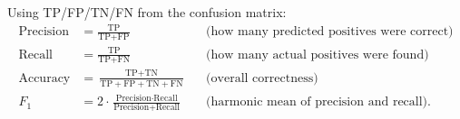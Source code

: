 \begin{center}
\end{center}

\begin{definition}
    Using TP/FP/TN/FN from the confusion matrix:
    \begin{align*}
        \text{Precision} & = \frac{\text{TP}}{\text{TP} + \text{FP}}                                               &  & \text{(how many predicted positives were correct)} \\
        \text{Recall}    & = \frac{\text{TP}}{\text{TP} + \text{FN}}                                               &  & \text{(how many actual positives were found)}      \\
        \text{Accuracy}  & = \frac{\text{TP} + \text{TN}}{\text{TP} + \text{FP} + \text{TN} + \text{FN}}           &  & \text{(overall correctness)}                       \\
        F_1              & = 2 \cdot \frac{\text{Precision} \cdot \text{Recall}}{\text{Precision} + \text{Recall}} &  & \text{(harmonic mean of precision and recall)}.
    \end{align*}
\end{definition}


